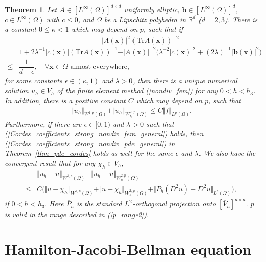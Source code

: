 \documentclass[12pt]{amsart}
\newcommand{\boldx}{\boldsymbol{x}}
\newtheorem{theorem}{Theorem}[section]
\theoremstyle{definition}
\theoremstyle{remark}
\begin{document}
\begin{theorem}
\label{thm_global_estimate_cordes}
Let $A \in [L^{\infty}(\Omega)]^{d\times d}$ uniformly elliptic, $\boldsymbol{b}\in [L^{\infty}(\Omega)]^{d}$, 
$c \in L^{\infty}(\Omega)$ with $c \leq 0$, and 
$\Omega$ be a Lipschitz polyhedra in $\mathbb{R}^{d}$ ($d=2,3$).  
There is a constant $0 \leq \kappa<1$ 
which may depend on $p$, such that if 
\begin{align}
\label{Cordes_coefficients_strong_nondiv_fem_general}
& \dfrac{\vert A(\boldx)\vert^{2}(\text{Tr} A
(\boldx))^{-2}}{1 + 2\lambda^{-1}\vert c(\boldx)\vert
(\text{Tr}A(\boldx))^{-1}
- \vert A(\boldx)\vert^{-2}
\big( \lambda^{-2} \vert c(\boldx)\vert^{2} 
+ (2\lambda)^{-1}\vert \boldsymbol{b}(\boldx)\vert^{2}\big)} \\
\nonumber 
\leq & \dfrac{1}{d + \epsilon}, \quad
\forall \boldx \in \Omega \text{ almost everywhere},
\end{align}
for some constants $\epsilon \in (\kappa,1)$ and $\lambda > 0$, then 
there is a unique numerical 
solution $u_{h}\in V_{h}$ of the finite element method (\ref{nondiv_fem}) for any 
$0< h < h_{3}$.
In addition, there is a positive constant $C$ which may depend on $p$, such that 
\begin{align*}
\Vert u_{h}\Vert_{W^{1,p}(\Omega)}+\Vert u_{h}\Vert_{W^{2,p}_{h}(\Omega)} \leq C \Vert f \Vert_{L^{p}(\Omega)}.
\end{align*}
Furthermore, if there are 
$\epsilon \in [0,1)$ and $\lambda>0$ such that (\ref{Cordes_coefficients_strong_nondiv_fem_general}) holds, then 
(\ref{Cordes_coefficients_strong_nondiv_pde_general}) in Theorem~\ref{thm_pde_cordes} holds as well for the same 
$\epsilon$ and $\lambda$. We also have the convergent result that 
for any $\chi_{h}\in V_{h}$, 
\begin{align}
\label{nondiv_fem_con_ineq}
& \Vert u_{h} - u\Vert_{W^{1,p}(\Omega)}
+ \Vert u_{h} - u\Vert_{W_{h}^{2,p}(\Omega)} \\
\nonumber
\leq & C \big(\Vert u - \chi_{h}\Vert_{W^{1,p}(\Omega)}
+\Vert u - \chi_{h}\Vert_{W_{h}^{2,p}(\Omega)} 
+ \Vert \overline{P}_{h}(D^{2}u) - D^{2}u\Vert_{L^{p}(\Omega)} \big),
\end{align}
if $0 < h < h_{3}$. Here $\overline{P}_{h}$ is the standard $L^{2}$-orthogonal projection 
onto $[\overline{V}_{h}]^{d\times d}$. 
$p$ is valid in the range described in (\ref{p_range2}).
\end{theorem}

\section{Hamilton-Jacobi-Bellman equation}
\label{sec_hjb}
\end{document}
